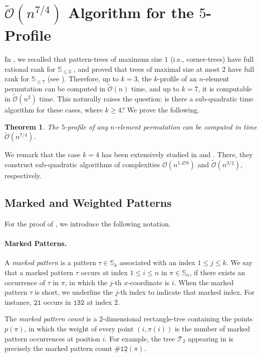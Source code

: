 \documentclass{article}
\newcommand{\Sn}{\mathbb{S}_n}
\newcommand{\pc}[2]{{\# \mathtt{ #1 } \left( #2 \right)}}
\theoremstyle{remark}
\newcommand{\Otilde}[1]{\widetilde{\mathcal{O}}\left( #1 \right)}
\newcommand{\Oh}[1]{\mathcal{O}\left( #1 \right)}
\theoremstyle{plain}
\newtheorem{thm}{Theorem}
\begin{document}
 \section{\texorpdfstring{$\Otilde{n^{7/4}}$}{O(n 7/4)} Algorithm for the \texorpdfstring{$5$}{5}-Profile}
\label{sect:5_prof_alg}

In , we recalled that pattern-trees of maximum size $1$ (i.e., corner-trees)
have full rational rank for $\mathbb{S}_{\le 3}$ \cite{even2021counting},
and proved that trees of maximal size at most $2$ have full rank for $\mathbb{S}_{\le 7}$ (see ). 
Therefore, up to $k=3$, the $k$-profile of an $n$-element permutation can be computed in $\Otilde{n}$ time,
and up to $k=7$, it is computable in $\Otilde{n^2}$ time.
This naturally raises the question: is there a sub-quadratic time algorithm for these cases, where $k \ge 4$?
We prove the following.

\begin{thm}
    \label{thm:fast-5-prof}
    The $5$-profile of any $n$-element permutation can be computed in time $\Otilde{n^{7/4}}$.
\end{thm}

We remark that the case $k=4$ has been extensively studied in \cite{dudek2020counting} and \cite{even2021counting}.
There, they construct sub-quadratic algorithms of complexities $\Oh{n^{1.478}}$ and $\Otilde{n^{3/2}}$, respectively.

\subsection{Marked and Weighted Patterns}

For the proof of , we introduce the following notation.

\paragraph{Marked Patterns.}
A \emph{marked pattern} is a pattern $\tau\in\mathbb{S}_k$ associated with an index $1\le j \le k$.
We say that a marked pattern $\tau$ occurs at index $1\le i\le n$ in $\pi\in\Sn$,
if there exists an occurrence of $\tau$ in $\pi$, in which the $j$-th $x$-coordinate is $i$.
When the marked pattern $\tau$ is short, we underline the $j$-th index to indicate that 
marked index.
For instance, $\mathtt{\underline{2}1}$ occurs in $\mathtt{132}$ at index $2$.

The \emph{marked pattern count} is a $2$-dimensional rectangle-tree containing the points $p(\pi)$,
in which the weight of every point $(i,\pi(i))$ is the number of marked pattern occurrences at position $i$.
For example, the tree $\mathcal{T}_2$ appearing in  is precisely the marked pattern count
$\pc{1\underline{2}}{\pi}$.
\end{document}
